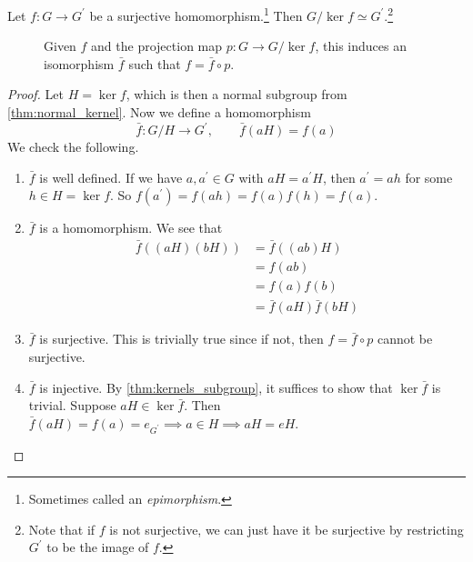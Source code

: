   \begin{theorem}
    Let $f: G \to G^\prime$ be a surjective homomorphism.\footnote{Sometimes called an \textit{epimorphism}.} Then $G/{\ker{f}} \simeq G^\prime$.\footnote{Note that if $f$ is not surjective, we can just have it be surjective by restricting $G^\prime$ to be the image of $f$. }

    \begin{figure}[H]
      \centering 
      \caption{Given $f$ and the projection map $p: G \to G/{\ker{f}}$, this induces an isomorphism $\bar{f}$ such that $f = \bar{f} \circ p$.} 
      \label{fig:group_fund_homo_theorem}
    \end{figure}
  \end{theorem}
  \begin{proof}
    Let $H = \ker{f}$, which is then a normal subgroup from \ref{thm:normal_kernel}. Now we define a homomorphism 
    \begin{equation}
      \bar{f}: G/H \to G^\prime, \qquad \bar{f}(aH) = f(a)
    \end{equation}
    We check the following. 
    \begin{enumerate}
      \item $\bar{f}$ is well defined. If we have $a, a^\prime \in G$ with $aH = a^\prime H$, then $a^\prime = a h$ for some $h \in H = \ker{f}$. So $f(a^\prime) = f(ah) = f(a) f(h) = f(a)$. 

      \item $\bar{f}$ is a homomorphism. We see that 
      \begin{align}
        \bar{f}((aH)(bH)) & = \bar{f}((ab)H) \\ 
                          & = f(ab) \\
                          & = f(a) f(b) \\  
                          & = \bar{f}(aH) \bar{f}(bH) 
      \end{align}

      \item $\bar{f}$ is surjective. This is trivially true since if not, then $f = \bar{f} \circ p$ cannot be surjective. 

      \item $\bar{f}$ is injective. By \ref{thm:kernels_subgroup}, it suffices to show that $\ker{\bar{f}}$ is trivial. Suppose $aH \in \ker{\bar{f}}$. Then $\bar{f}(aH) = f(a) = e_{G^\prime} \implies a \in H \implies aH = eH$. 
    \end{enumerate}
  \end{proof}

